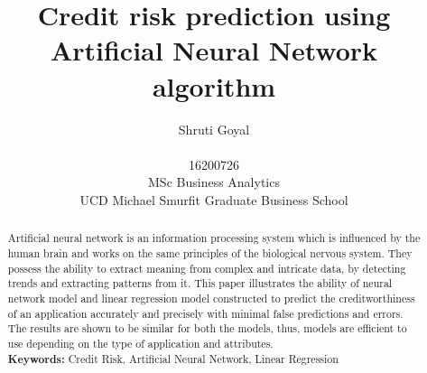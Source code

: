 \documentclass{article}[]
\begin{document}
\title{{\bf Credit risk prediction using Artificial Neural Network algorithm}\\ }

\author{Shruti Goyal\\ \vspace{0.4cm}\\ 
 16200726 \vspace{0.1cm}\\ MSc Business Analytics \vspace{0.1cm}\\ 
 UCD Michael Smurfit Graduate Business School}

\date{}
\maketitle
\begin{abstract}
  Artificial neural network is an information processing system which is influenced by the human brain and works on the same principles of the biological nervous system. They possess the ability to extract meaning from complex and intricate data, by detecting trends and extracting patterns from it. This paper illustrates the ability of neural network model and linear regression model constructed to predict the creditworthiness of an application accurately and precisely with minimal false predictions and errors. The results are shown to be similar for both the models, thus, models are efficient to use depending on the type of application and attributes. \\
  \textbf{Keywords:} Credit Risk, Artificial Neural Network, Linear Regression
\end{abstract}
\end{document}
